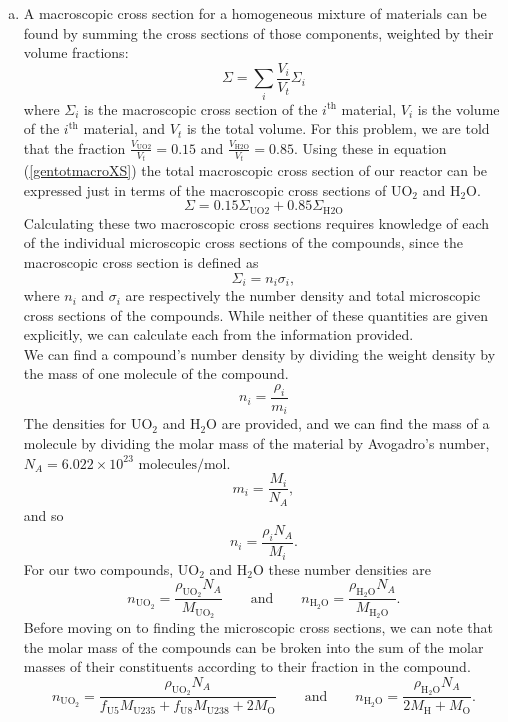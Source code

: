 \documentclass{report}
\begin{document}
\begin{enumerate}[a)]
\item A macroscopic cross section for a homogeneous mixture of materials can be found by summing the cross sections of those components, weighted by their volume fractions: 
\begin{equation}
\label{gentotmacroXS}
\Sigma = \sum_{i} \frac{V_i}{V_t}\Sigma_i
\end{equation}
where $\Sigma_i$ is the macroscopic cross section of the $i^{\text{th}}$ material, $V_i$ is the volume of the $i^{\text{th}}$ material, and $V_t$ is the total volume. For this problem, we are told that the fraction $\frac{V_{\text{UO2}}}{V_t} = 0.15$ and $\frac{V_{\text{H2O}}}{V_t} = 0.85$. Using these in equation (\ref{gentotmacroXS}) the total macroscopic cross section of our reactor can be expressed just in terms of the macroscopic cross sections of UO$_2$ and H$_2$O.
\begin{equation}
\label{totmacroXS}
\Sigma = 0.15\Sigma_{\text{UO2}} + 0.85\Sigma_{\text{H2O}}
\end{equation}
Calculating these two macroscopic cross sections requires knowledge of each of the individual microscopic cross sections of the compounds, since the macroscopic cross section is defined as
\begin{equation}
\label{macroXSi}
\Sigma_i = n_i\sigma_i ,
\end{equation}
where $n_i$ and $\sigma_i$ are respectively the number density and total microscopic cross sections of the compounds. While neither of these quantities are given explicitly, we can calculate each from the information provided. 
\-\\

We can find a compound's number density by dividing the weight density by the mass of one molecule of the compound. 
$$ n_i = \frac{\rho_i}{m_i} $$
The densities for UO$_2$ and H$_2$O are provided, and we can find the mass of a molecule by dividing the molar mass of the material by Avogadro's number, $N_A = 6.022\times10^{23}\text{ molecules/mol}$.
$$ m_i = \frac{M_i}{N_A}, $$
and so
$$ n_i = \frac{\rho_i N_A}{M_i} .$$
For our two compounds, UO$_2$ and H$_2$O these number densities are
$$ n_{\text{UO}_2} = \frac{\rho_{\text{UO}_2} N_A}{M_{\text{UO}_2}} \qquad\text{and}\qquad n_{\text{H}_2\text{O}} = \frac{\rho_{\text{H}_2\text{O}} N_A}{M_{\text{H}_2\text{O}}} .$$
Before moving on to finding the microscopic cross sections, we can note that the molar mass of the compounds can be broken into the sum of the molar masses of their constituents according to their fraction in the compound.
$$ n_{\text{UO}_2} = \frac{\rho_{\text{UO}_2} N_A}{f_{\text{U}5}M_{\text{U235}} + f_{\text{U}8}M_{\text{U238}} + 2M_{\text{O}}} \qquad\text{and}\qquad n_{\text{H}_2\text{O}} = \frac{\rho_{\text{H}_2\text{O}} N_A}{2M_{\text{H}} + M_\text{O}} .$$
\-\\


\end{enumerate}
\end{document}
